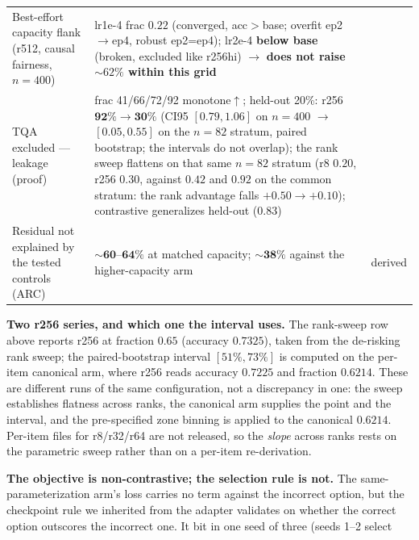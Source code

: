 \begin{table}[tbp]
\begin{threeparttable}
\begin{tabular}{L{5.4cm} L{6.6cm} L{2.8cm}}
Best-effort capacity flank (r512, causal fairness, $n{=}400$) & lr1e-4 frac
$\mathbf{0.22}$ (converged, acc${>}$base; overfit ep2${\rightarrow}$ep4, robust
ep2=ep4); lr2e-4 \textbf{below base} (broken, excluded like r256hi) $\rightarrow$
\textbf{does not raise ${\sim}62\%$ within this grid} &  \\
TQA excluded --- leakage (proof) & frac 41/66/72/92 monotone${\uparrow}$; held-out
20\%: r256 $\mathbf{92\%{\rightarrow}30\%}$ (CI95 $[0.79, 1.06]$ on $n{=}400$
$\rightarrow$ $[0.05, 0.55]$ on the $n{=}82$ stratum, paired bootstrap; the
intervals do not overlap); the rank sweep flattens on that same $n{=}82$ stratum
(r8 $0.20$, r256 $0.30$, against $0.42$ and $0.92$ on the common stratum: the rank
advantage falls $+0.50 \rightarrow +0.10$); contrastive generalizes held-out (0.83) &
 \\
\midrule
Residual not explained by the tested controls (ARC) & ${\sim}\mathbf{60}$--$\mathbf{64\%}$
at matched capacity; ${\sim}\mathbf{38\%}$ against the higher-capacity arm & derived \\
\bottomrule
\end{tabular}
\begin{tablenotes}[flushleft]\footnotesize
\item \textbf{Two r256 series, and which one the interval uses.} The rank-sweep row
above reports r256 at fraction $0.65$ (accuracy $0.7325$), taken from the
de-risking rank sweep; the paired-bootstrap interval $[51\%, 73\%]$ is computed on
the per-item canonical arm, where r256 reads accuracy $0.7225$ and fraction
$\mathbf{0.6214}$. These are different runs of the same configuration, not a
discrepancy in one: the sweep establishes flatness across ranks, the canonical arm
supplies the point and the interval, and the pre-specified zone binning is applied to
the canonical $0.6214$. Per-item files for r8/r32/r64 are not released, so the
\emph{slope} across ranks rests on the parametric sweep rather than on a per-item
re-derivation.
\item \textbf{The objective is non-contrastive; the selection rule is not.} The
same-parameterization arm's loss carries no term against the incorrect option, but
the checkpoint rule we inherited from the adapter validates on whether the correct
option outscores the incorrect one. It bit in one seed of three (seeds 1--2 select

\end{tablenotes}
\end{threeparttable}
\end{table}
